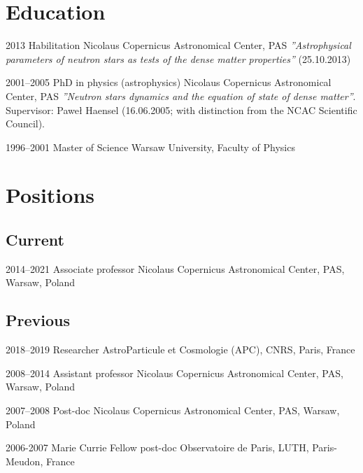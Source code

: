 \documentclass[]{friggeri-cv} %
\begin{document}

\section{Education}
\begin{entrylist}
\entry
{2013}
{Habilitation}
{Nicolaus Copernicus Astronomical Center, PAS} 
{{ \it ''Astrophysical parameters of neutron stars as tests of the dense matter properties''} (25.10.2013)} 

\entry
{2001--2005}
{PhD {\normalfont in physics (astrophysics)}}
{Nicolaus Copernicus Astronomical Center, PAS}
{{\it ''Neutron stars dynamics and the equation of state of dense matter''}. Supervisor: Paweł Haensel (16.06.2005; with distinction from the NCAC Scientific Council).} 

\entry
{1996--2001}
{Master {\normalfont of Science}}
{Warsaw University, Faculty of Physics}

\end{entrylist}


\section{Positions}
\subsection{Current}
\begin{entrylist}

\entry
{2014--2021}
{Associate professor}
{Nicolaus Copernicus Astronomical Center, PAS, Warsaw, Poland}

\end{entrylist}

\subsection{Previous}

\begin{entrylist}

\entry
{2018--2019}
{Researcher}
{AstroParticule et Cosmologie (APC), CNRS, Paris, France}

\entry
{2008--2014}
{Assistant professor}
{Nicolaus Copernicus Astronomical Center, PAS, Warsaw, Poland}

\entry
{2007--2008}
{Post-doc}
{Nicolaus Copernicus Astronomical Center, PAS, Warsaw, Poland}

\entry
{2006-2007}
{Marie Currie Fellow post-doc}
{Observatoire de Paris, LUTH, Paris-Meudon, France}

\end{entrylist}
\end{document}
